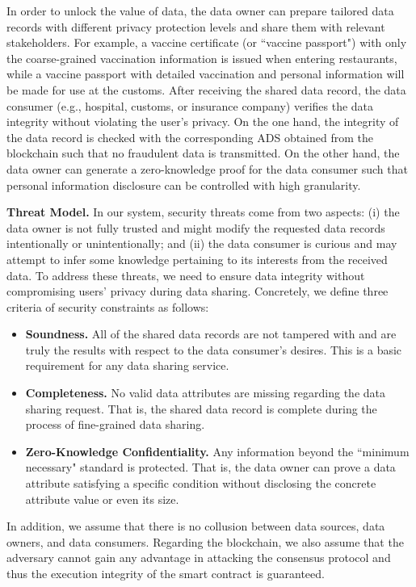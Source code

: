 \documentclass[11pt,divpdfm]{article}
\begin{document}
In order to unlock the value of data, the data owner can prepare tailored data records with different privacy protection levels and share them with relevant stakeholders.
For example, a vaccine certificate (or ``vaccine passport") with only the coarse-grained vaccination information is issued when entering restaurants, while a vaccine passport with detailed vaccination and personal information will be made for use at the customs.
After receiving the shared data record, the data consumer (e.g., hospital, customs, or insurance company) verifies the data integrity without violating the user's privacy.
On the one hand, the integrity of the data record is checked with the corresponding ADS obtained from the blockchain such that no fraudulent data is transmitted.
On the other hand, the data owner can generate a zero-knowledge proof for the data consumer such that personal information disclosure can be controlled with high granularity.


\textbf{Threat Model.}
In our system, security threats come from two aspects:
(i) the data owner is not fully trusted and might modify the requested data records intentionally or unintentionally;
and (ii) the data consumer is curious and may attempt to infer some knowledge pertaining to its interests from the received data.
To address these threats, we need to ensure data integrity without compromising users' privacy during data sharing.
Concretely, we define three criteria of security constraints as follows:
\begin{itemize}
	\item
	\textbf{Soundness.} All of the shared data records are not tampered with and are truly the results with respect to the data consumer's desires.
	This is a basic requirement for any data sharing service.
	\item
	\textbf{Completeness.} No valid data attributes are missing regarding the data sharing request.
	That is, the shared data record is complete during the process of fine-grained data sharing.
	\item
	\textbf{Zero-Knowledge Confidentiality.}
	Any information beyond the ``minimum necessary" standard is protected.
	That is, the data owner can prove a data attribute satisfying a specific condition without disclosing the concrete attribute value or even its size.
\end{itemize}

In addition, we assume that there is no collusion between data sources, data owners, and data consumers.
Regarding the blockchain, we also assume that the adversary cannot gain any advantage in attacking the consensus protocol and thus the execution integrity of the smart contract is guaranteed.
\end{document}
